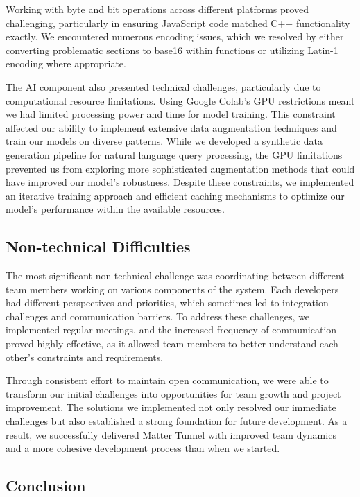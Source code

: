 \documentclass[conference]{IEEEtran}
\begin{document}
Working with byte and bit operations across different platforms proved challenging, particularly in ensuring JavaScript code matched C++ functionality exactly. We encountered numerous encoding issues, which we resolved by either converting problematic sections to base16 within functions or utilizing Latin-1 encoding where appropriate.

The AI component also presented technical challenges, particularly due to computational resource limitations. Using Google Colab's GPU restrictions meant we had limited processing power and time for model training. This constraint affected our ability to implement extensive data augmentation techniques and train our models on diverse patterns. While we developed a synthetic data generation pipeline for natural language query processing, the GPU limitations prevented us from exploring more sophisticated augmentation methods that could have improved our model's robustness. Despite these constraints, we implemented an iterative training approach and efficient caching mechanisms to optimize our model's performance within the available resources.

\subsection{Non-technical Difficulties}

The most significant non-technical challenge was coordinating between different team members working on various components of the system. Each developers had different perspectives and priorities, which sometimes led to integration challenges and communication barriers. To address these challenges, we implemented regular meetings, and the increased frequency of communication proved highly effective, as it allowed team members to better understand each other’s constraints and requirements.

Through consistent effort to maintain open communication, we were able to transform our initial challenges into opportunities for team growth and project improvement. The solutions we implemented not only resolved our immediate challenges but also established a strong foundation for future development. As a result, we successfully delivered Matter Tunnel with improved team dynamics and a more cohesive development process than when we started.


\subsection{Conclusion}
\end{document}
